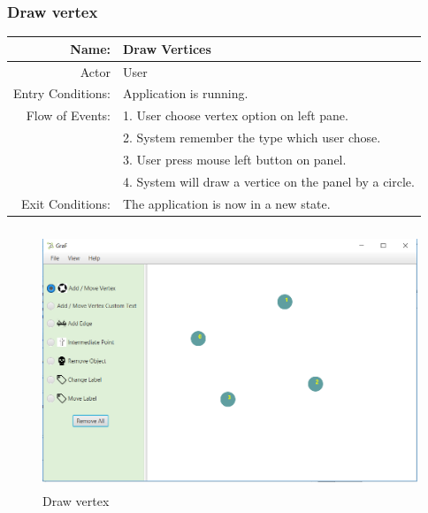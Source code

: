\documentclass[a4paper,10pt]{article}
\begin{document}
\subsubsection{Draw vertex}
	\begin{tabular}{|r|l|}
\hline
Name: & Draw Vertices \\
\hline
Actor & User \\
\hline
Entry Conditions: & Application is running. \\
\hline
Flow of Events: & 1. User choose vertex option on left pane. \\


& 2. System remember the type which user chose.  \\
& 3. User press mouse left button on panel.  \\
& 4. System will draw a vertice on the panel by a circle.  \\
\hline
Exit Conditions: & The application is now in a new state. \\
\hline

\end{tabular}
	\paragraph{}
	
\begin{figure}[H]
		\centering
		\includegraphics[height = 3in]{drawVertex.png}
		\caption[Optional caption]{Draw vertex}
		\label{fig:Repository}
	\end{figure}
\paragraph{}
\end{document}
